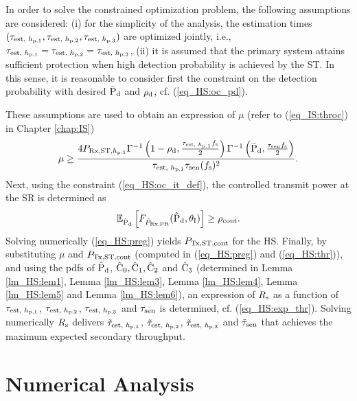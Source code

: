 \begin{IEEEproof}[Solution] 
In order to solve the constrained optimization problem, the following assumptions are considered: (i) for the simplicity of the analysis, the estimation times $(\tau_{\text{est, $h_{\text{p,1}}$}}, \tau_{\text{est, $h_{\text{p,2}}$}}, \tau_{\text{est, $h_{\text{p,3}}$}})$ are optimized jointly, i.e., $\tau_{\text{est, $h_{\text{p,1}}$}} = \tau_{\text{est, $h_{\text{p,2}}$}} = \tau_{\text{est, $h_{\text{p,3}}$}}$, (ii) it is assumed that the primary system attains sufficient protection when high detection probability is achieved by the ST. In this sense, it is reasonable to consider first the constraint on the detection probability with desired $\bar{\text{P}}_{\text{d}}$ and $\rho_{\text{d}}$, cf. (\ref{eq_HS:oc_pd}). 

These assumptions are used to obtain an expression of $\mu$ (refer to (\ref{eq_IS:throc}) in Chapter \ref{chap:IS}) 
\begin{align}
\mu \ge \frac{4 P_{\text{Rx,ST,$h_{\text{p,1}}$}} \Gamma^{-1} \left(1 - \rho_{\text{d}}, \frac{\tau_{\text{est, $h_{\text{p,1}}$}} f_{\text{s}}}{2}\right) \Gamma^{-1} \left(\bar{\text{P}}_{\text{d}}, \frac{\tau_{\text{sen}} f_{\text{s}}}{2}\right)}{ \tau_{\text{est, $h_{\text{p,1}}$}} \tau_{\text{sen}} (f_{\text{s}})^2  }. 
\label{eq_HS:thr}
\end{align}
Next, using the constraint (\ref{eq_HS:oc_it_def}), the controlled transmit power at the SR is determined as  
\begin{align}
\e{\epd}{\fprcvdpr(\epd, \ite)} \ge \opc.%
\label{eq_HS:preg}
\end{align}
Solving numerically (\ref{eq_HS:preg}) yields $P_{\text{Tx,ST,cont}}$ for the HS.
Finally, by substituting $\mu$ and $P_{\text{Tx,ST,cont}}$ (computed in (\ref{eq_HS:preg}) and (\ref{eq_HS:thr})), and using the pdfs of $\hat{\text{P}}_{\text{d}}$, $\hat{\text{C}}_{\text{0}}, \hat{\text{C}}_{\text{1}}, \hat{\text{C}}_{\text{2}}$ and $\hat{\text{C}}_{\text{3}}$ (determined in Lemma \ref{lm_HS:lem1}, Lemma \ref{lm_HS:lem3}, Lemma \ref{lm_HS:lem4}, Lemma \ref{lm_HS:lem5} and Lemma \ref{lm_HS:lem6}), an expression of $R_{\text{s}}$ as a function of $\tau_{\text{est, $h_{\text{p,1}}$}}$, $\tau_{\text{est, $h_{\text{p,2}}$}}$, $\tau_{\text{est, $h_{\text{p,3}}$}}$ and $\tau_{\text{sen}}$ is determined, cf. (\ref{eq_HS:exp_thr}). Solving numerically $R_{\text{s}}$ delivers $\tilde{\tau}_{\text{est, $h_{\text{p,1}}$}}$, $\tilde{\tau}_{\text{est, $h_{\text{p,2}}$}}$, $\tilde{\tau}_{\text{est, $h_{\text{p,3}}$}}$ and $\tilde{\tau}_{\text{sen}}$ that achieves the maximum expected secondary throughput.  
\end{IEEEproof}
\section{Numerical Analysis} \label{sec_HS:num_ana}

